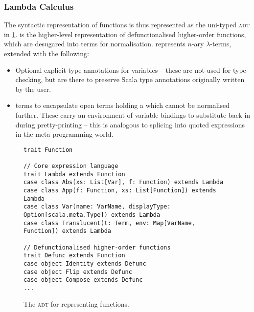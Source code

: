 \documentclass[../../../main.tex]{subfiles}
\begin{document}

\subsubsection{Lambda Calculus}

The syntactic representation of functions is thus represented as the uni-typed  \textsc{adt} in \cref{fig:function-adt}.
 is the higher-level representation of defunctionalised higher-order functions, which are desugared into  terms for normalisation.
 represents $n$-ary $\lambda$-terms, extended with the following:
\begin{itemize}
  \item Optional explicit type annotations for variables -- these are not used for type-checking, but are there to preserve Scala type annotations originally written by the user.
  \item {} terms to encapsulate open terms holding a  which cannot be normalised further. These carry an environment of variable bindings to substitute back in during pretty-printing -- this is analogous to splicing into quoted expressions in the meta-programming world.
\end{itemize}

\begin{figure}
\begin{verbatim}
trait Function

// Core expression language
trait Lambda extends Function
case class Abs(xs: List[Var], f: Function) extends Lambda
case class App(f: Function, xs: List[Function]) extends Lambda
case class Var(name: VarName, displayType: Option[scala.meta.Type]) extends Lambda
case class Translucent(t: Term, env: Map[VarName, Function]) extends Lambda

// Defunctionalised higher-order functions
trait Defunc extends Function
case object Identity extends Defunc
case object Flip extends Defunc
case object Compose extends Defunc
...
\end{verbatim}
\caption{The  \textsc{adt} for representing functions.}
\label{fig:function-adt}
\end{figure}
\end{document}
